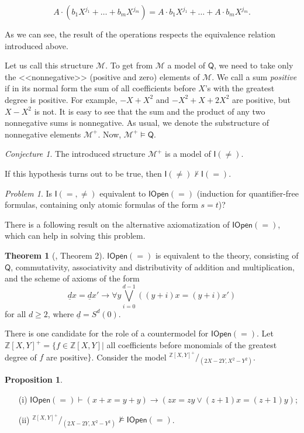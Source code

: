 \documentclass[a4paper,14pt]{article}
\theoremstyle{definition}
\theoremstyle{theorem}
\newtheorem{theorem}{Theorem}[section]
\theoremstyle{lemma}
\theoremstyle{proposition}
\newtheorem{proposition}{Proposition}[section]
\theoremstyle{remark}
\theoremstyle{corollary}
\theoremstyle{problem}
\newtheorem{problem}{Problem}
\theoremstyle{hypothesis}
\newtheorem{hypothesis}{Conjecture}
\begin{document}
$$A \cdot (b_1 X^{j_1} + \dots + b_m X^{j_m}) = A \cdot b_1 X^{j_1} + \dots + A \cdot b_m X^{j_m}.$$

As we can see, the result of the operations respects the equivalence relation introduced above.

Let us call this structure $\mathcal M$. To get from $\mathcal M$ a model of $\mathsf Q$, we need to take only the <<nonnegative>> (positive and zero) elements of $\mathcal M$. We call a sum \emph{positive} if in its normal form the sum of all coefficients before $X$'s with the greatest degree is positive. For example, $-X + X^2$ and $-X^2 + X + 2X^2$ are positive, but $X - X^2$ is not. It is easy to see that the sum and the product of any two nonnegative sums is nonnegative. As usual, we denote the substructure of nonnegative elements $\mathcal M^+$. 
Now, $\mathcal M^+ \vDash \mathsf Q$.

\begin{hypothesis}
    The introduced structure $\mathcal M^+$ is a model of $\mathsf I(\ne)$.
\end{hypothesis}

If this hypothesis turns out to be true, then $\mathsf I(\ne) \nvdash \mathsf I(=)$.

\begin{problem}
    Is $\mathsf I(=, \ne)$ equivalent to $\mathsf{IOpen}(=)$ (induction for quantifier-free formulas, containing only atomic formulas of the form $s = t$)?
\end{problem}

There is a following result on the alternative axiomatization of $\mathsf{IOpen(=)}$, which can help in solving this problem.

\begin{theorem}[\cite{shepherdson:1967}, Theorem 2]
    $\mathsf{IOpen(=)}$ is equivalent to the theory, consisting of $\mathsf Q$, commutativity, associativity and distributivity of addition and multiplication, and the scheme of axioms of the form
    $$\underline{d} x = \underline{d} x' \rightarrow \forall y \bigvee\limits_{i = 0}^{d - 1} ((y + i) x = (y + i) x')$$
    for all $d \geqslant 2$, where $\underline{d} = S^d(0)$.
\end{theorem}

\iffalse
There is one candidate for the role of a countermodel for $\mathsf{IOpen}(=)$. Let $\mathbb Z[X, Y]^+ = \{f \in \mathbb Z[X, Y]|$ all coefficients before monomials of the greatest degree of $f$ are positive$\}$. Consider the model $^{\mathbb Z[X, Y]^+}\!/\!_{(2 X - 2 Y, X^2 - Y^2)}$.
\begin{proposition}
    \begin{enumerate}
        \item[(i)] $\mathsf{IOpen}(=) \vdash (x + x = y + y) \rightarrow (z x = z y \vee (z + 1) x = (z + 1) y)$;
        \item[(ii)] $^{\mathbb Z[X, Y]^+}\!/\!_{(2 X - 2 Y, X^2 - Y^2)} \nvDash \mathsf{IOpen}(=)$.
    \end{enumerate}
\end{proposition}
\end{document}
